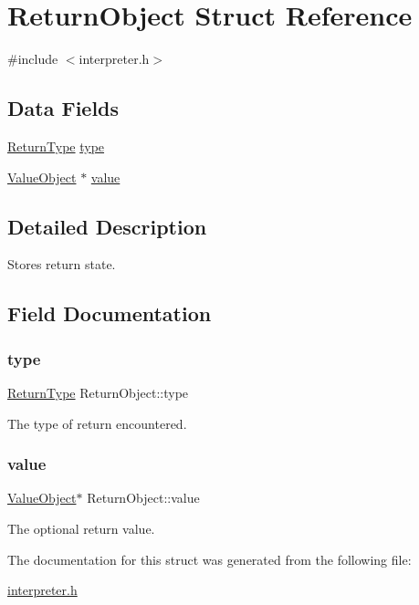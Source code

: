 \hypertarget{struct_return_object}{}\section{Return\+Object Struct Reference}
\label{struct_return_object}


{\ttfamily \#include $<$interpreter.\+h$>$}

\subsection*{Data Fields}
\begin{DoxyCompactItemize}
\item 
\hyperlink{interpreter_8h_a36a419f0b50a0c1d2d4cf712e0ba64cc}{Return\+Type} \hyperlink{struct_return_object_a79da4f77fc9fa5dfeefbd750b0caddb0}{type}
\item 
\hyperlink{struct_value_object}{Value\+Object} $\ast$ \hyperlink{struct_return_object_a52bd553a4949e0f49f377778402e2cbe}{value}
\end{DoxyCompactItemize}


\subsection{Detailed Description}
Stores return state. 

\subsection{Field Documentation}
\mbox{\label{struct_return_object_a79da4f77fc9fa5dfeefbd750b0caddb0}} 
\subsubsection{\texorpdfstring{type}{type}}
{\footnotesize\ttfamily \hyperlink{interpreter_8h_a36a419f0b50a0c1d2d4cf712e0ba64cc}{Return\+Type} Return\+Object\+::type}

The type of return encountered. \mbox{\label{struct_return_object_a52bd553a4949e0f49f377778402e2cbe}} 
\subsubsection{\texorpdfstring{value}{value}}
{\footnotesize\ttfamily \hyperlink{struct_value_object}{Value\+Object}$\ast$ Return\+Object\+::value}

The optional return value. 

The documentation for this struct was generated from the following file\+:\begin{DoxyCompactItemize}
\item 
\hyperlink{interpreter_8h}{interpreter.\+h}\end{DoxyCompactItemize}

